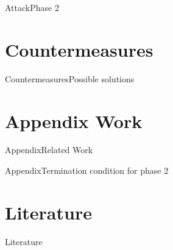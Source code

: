 \documentclass[aspectratio=169, hyperref={colorlinks=true, allcolors=SecondaryColor}, c]{beamer}
\begin{document}
\begin{frame}[fragile]{Attack}{Phase 2}
	\begin{center}
		\begin{adjustbox}{scale=0.7}
			
		\end{adjustbox}
	\end{center}
\end{frame}

\section{Countermeasures}

\begin{frame}[fragile]{Countermeasures}{Possible solutions}
\end{frame}

\section{Appendix Work}

\begin{frame}[fragile]{Appendix}{Related Work}
\end{frame}

\begin{frame}[fragile]{Appendix}{Termination condition for phase 2}
\end{frame}

\section{Literature}

\begin{frame}[allowframebreaks]{Literature}
	\printbibliography
\end{frame}
%
%


\end{document}
